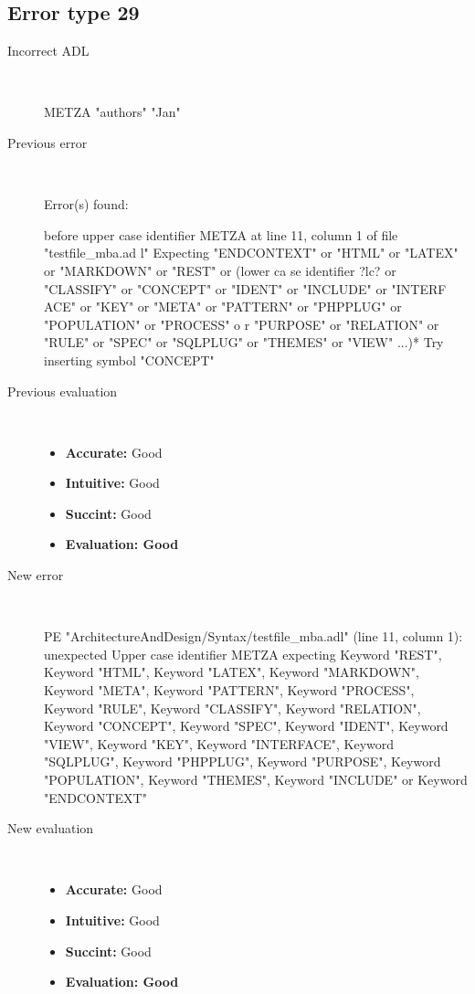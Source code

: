 \subsection{Error type 29}
  \begin{description}
  \item[Incorrect ADL]~\\
\begin{adl}
METZA "authors"  "Jan"\end{adl}
  \item[Previous error]~\\
\begin{haskell}
Error(s) found:

before upper case identifier METZA at line 11, column 1 of file "testfile_mba.ad
l"
Expecting "ENDCONTEXT" or "HTML" or "LATEX" or "MARKDOWN" or "REST" or (lower ca
se identifier ?lc? or "CLASSIFY" or "CONCEPT" or "IDENT" or "INCLUDE" or "INTERF
ACE" or "KEY" or "META" or "PATTERN" or "PHPPLUG" or "POPULATION" or "PROCESS" o
r "PURPOSE" or "RELATION" or "RULE" or "SPEC" or "SQLPLUG" or "THEMES" or "VIEW"
 ...)*
Try inserting symbol "CONCEPT"\end{haskell}
  \item[Previous evaluation]~\\
    \begin{itemize}
    \item \textbf{Accurate:} Good
    \item \textbf{Intuitive:} Good
    \item \textbf{Succint:} Good
    \item \textbf{Evaluation: Good}
    \end{itemize}
  \item[New error]~\\
\begin{haskell}
PE "ArchitectureAndDesign/Syntax/testfile_mba.adl" (line 11, column 1):
unexpected Upper case identifier METZA
expecting Keyword "REST", Keyword "HTML", Keyword "LATEX", Keyword "MARKDOWN", Keyword "META", Keyword "PATTERN", Keyword "PROCESS", Keyword "RULE", Keyword "CLASSIFY", Keyword "RELATION", Keyword "CONCEPT", Keyword "SPEC", Keyword "IDENT", Keyword "VIEW", Keyword "KEY", Keyword "INTERFACE", Keyword "SQLPLUG", Keyword "PHPPLUG", Keyword "PURPOSE", Keyword "POPULATION", Keyword "THEMES", Keyword "INCLUDE" or Keyword "ENDCONTEXT"
\end{haskell}
  \item[New evaluation]~\\
    \begin{itemize}
    \item \textbf{Accurate:} Good
    \item \textbf{Intuitive:} Good
    \item \textbf{Succint:} Good
    \item \textbf{Evaluation: Good
}
    \end{itemize}
  \end{description}

